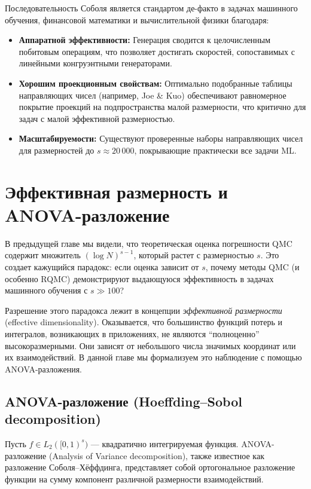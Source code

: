 \documentclass[12pt, a4paper]{article}
\theoremstyle{plain}
\theoremstyle{definition}
\theoremstyle{remark}
\newcommand{\II}{[0, 1)}
\begin{document}
Последовательность Соболя является стандартом де-факто в задачах машинного обучения, финансовой математики и вычислительной физики благодаря:
\begin{itemize}
    \item \textbf{Аппаратной эффективности:} Генерация сводится к целочисленным побитовым операциям, что позволяет достигать скоростей, сопоставимых с линейными конгруэнтными генераторами.
    \item \textbf{Хорошим проекционным свойствам:} Оптимально подобранные таблицы направляющих чисел (например, Joe \& Kuo) обеспечивают равномерное покрытие проекций на подпространства малой размерности, что критично для задач с малой эффективной размерностью.
    \item \textbf{Масштабируемости:} Существуют проверенные наборы направляющих чисел для размерностей до $s \approx 20\,000$, покрывающие практически все задачи ML.
\end{itemize}

\section{Эффективная размерность и ANOVA-разложение}
\label{sec:effective_dim}

В предыдущей главе мы видели, что теоретическая оценка погрешности QMC содержит множитель $(\log N)^{s-1}$, который растет с размерностью $s$. Это создает кажущийся парадокс: если оценка зависит от $s$, почему методы QMC (и особенно RQMC) демонстрируют выдающуюся эффективность в задачах машинного обучения с $s \gg 100$?

Разрешение этого парадокса лежит в концепции \textit{эффективной размерности} (effective dimensionality). Оказывается, что большинство функций потерь и интегралов, возникающих в приложениях, не являются ``полноценно'' высокоразмерными. Они зависят от небольшого числа значимых координат или их взаимодействий. В данной главе мы формализуем это наблюдение с помощью ANOVA-разложения.

\subsection{ANOVA-разложение (Hoeffding--Sobol decomposition)}
Пусть $f \in L_2(\II^s)$ --- квадратично интегрируемая функция. ANOVA-разложение (Analysis of Variance decomposition), также известное как разложение Соболя--Хёффдинга, представляет собой ортогональное разложение функции на сумму компонент различной размерности взаимодействий.
\end{document}
